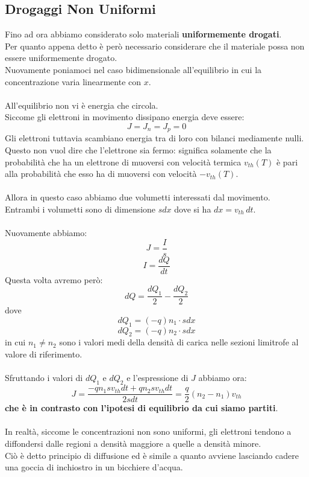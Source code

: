 \documentclass{article}
\numberwithin{equation}{subsection}
\begin{document}
	\subsection{Drogaggi Non Uniformi}
	Fino ad ora abbiamo considerato solo materiali \textbf{uniformemente drogati}. \\
	Per quanto appena detto è però necessario considerare che il materiale possa non essere uniformemente drogato. \\
	Nuovamente poniamoci nel caso bidimensionale all’equilibrio in cui la concentrazione varia linearmente con $x$.\\\\
	All’equilibrio non vi è energia che circola. \\
	Siccome gli elettroni in movimento dissipano energia deve essere:
	$$J = J_n = J_p = 0$$
	Gli elettroni tuttavia scambiano energia tra di loro con bilanci mediamente nulli. \\
	Questo non vuol dire che l’elettrone sia fermo: significa solamente che la probabilità che ha un elettrone di muoversi con velocità termica $v_{th}(T)$ è pari alla probabilità che esso ha di muoversi con velocità $-v_{th}(T)$.\\\\
	Allora in questo caso abbiamo due volumetti interessati dal movimento. \\
	Entrambi i volumetti sono di dimensione $sdx$ dove si ha $dx = v_{th} \, dt$.\\\\
	Nuovamente abbiamo:
	$$J = \frac{I}{s}$$
	$$I = \frac{dQ}{dt}$$
	Questa volta avremo però:
	$$dQ = \frac{dQ_1}{2} - \frac{dQ_2}{2}$$
	dove
	$$dQ_1 = (-q) n_1 \cdot s dx$$
	$$dQ_2 = (-q) n_2 \cdot s dx$$
	in cui $n_1 \neq n_2$ sono i valori medi della densità di carica nelle sezioni limitrofe al valore di riferimento.\\\\
	Sfruttando i valori di $dQ_1$ e $dQ_2$ e l’espressione di $J$ abbiamo ora:
	$$J = \frac{-qn_1 sv_{th} dt + qn_2 sv_{th} dt}{2s dt} = \frac{q}{2}(n_2 - n_1)v_{th}$$
	\textbf{che è in contrasto con l’ipotesi di equilibrio da cui siamo partiti}.\\\\
	In realtà, siccome le concentrazioni non sono uniformi, gli elettroni tendono a diffondersi dalle regioni a densità maggiore a quelle a densità minore. \\
	Ciò è detto principio di diffusione ed è simile a quanto avviene lasciando cadere una goccia di inchiostro in un bicchiere d’acqua.\\\\
\end{document}
